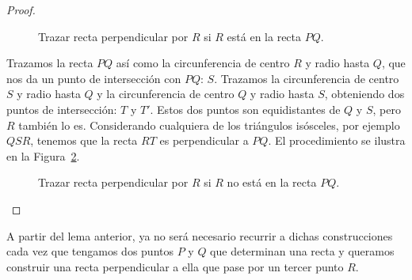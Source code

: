 \begin{lema}
\begin{proof}
\begin{description}
\begin{figure}[h]
                    \caption{Trazar recta perpendicular por $R$ si $R$ está en la recta $PQ$.}
                    \label{fig:pqr_caso1}
            \end{figure}
            \item [Suponiendo que $R$ no está en la recta $PQ$:]
                Trazamos la recta $PQ$ así como la circunferencia de centro $R$ y radio hasta $Q$, que nos da un punto de intersección con $PQ$: $S$. Trazamos la circunferencia de centro $S$ y radio hasta $Q$ y la circunferencia de centro $Q$ y radio hasta $S$, obteniendo dos puntos de intersección: $T$ y $T'$. Estos dos puntos son equidistantes de $Q$ y $S$, pero $R$ también lo es. Considerando cualquiera de los triángulos isósceles, por ejemplo $QSR$, tenemos que la recta $RT$ es perpendicular a $PQ$. El procedimiento se ilustra en la Figura~\ref{fig:pqr_caso2}.
            \begin{figure}[h]
                \centering
                \caption{Trazar recta perpendicular por $R$ si $R$ no está en la recta $PQ$.}
                \label{fig:pqr_caso2}
            \end{figure}
        \end{description}
    \end{proof}
\end{lema}
A partir del lema anterior, ya no será necesario recurrir a dichas construcciones cada vez que tengamos dos puntos $P$ y $Q$ que determinan una recta y queramos construir una recta perpendicular a ella que pase por un tercer punto $R$.

